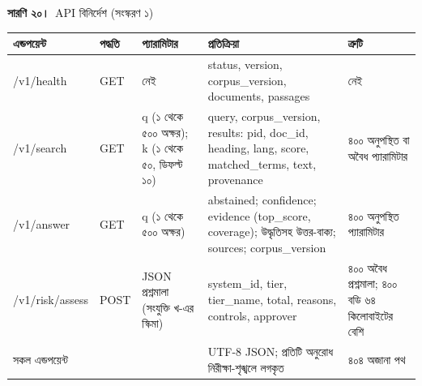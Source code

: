 \documentclass[border=10pt]{standalone}
\begin{document}
\begin{minipage}{17cm}
{\large\bfseries সারণি ২০।}\ {\large API বিনির্দেশ (সংস্করণ ১)}\par\vspace{7pt}
\small
{}
\begin{tabularx}{\linewidth}{@{}>{\hsize=1.105\hsize\raggedright\arraybackslash}X>{\hsize=0.407\hsize\raggedright\arraybackslash}X>{\hsize=1.163\hsize\raggedright\arraybackslash}X>{\hsize=1.512\hsize\raggedright\arraybackslash}X>{\hsize=0.814\hsize\raggedright\arraybackslash}X@{}}
\arrayrulecolor{bapilrule}\toprule
\rowcolor{white}\textbf{এন্ডপয়েন্ট} & \textbf{পদ্ধতি} & \textbf{প্যারামিটার} & \textbf{প্রতিক্রিয়া} & \textbf{ত্রুটি} \\
\midrule
/\allowbreak{}v1/\allowbreak{}health & GET & নেই & status, version, corpus\_version, documents, passages & নেই \\
/\allowbreak{}v1/\allowbreak{}search & GET & q (১ থেকে ৫০০ অক্ষর); k (১ থেকে ৫০, ডিফল্ট ১০) & query, corpus\_version, results: pid, doc\_id, heading, lang, score, matched\_terms, text, provenance & ৪০০ অনুপস্থিত বা অবৈধ প্যারামিটার \\
/\allowbreak{}v1/\allowbreak{}answer & GET & q (১ থেকে ৫০০ অক্ষর) & abstained; confidence; evidence (top\_score, coverage); উদ্ধৃতিসহ উত্তর-বাক্য; sources; corpus\_version & ৪০০ অনুপস্থিত প্যারামিটার \\
/\allowbreak{}v1/\allowbreak{}risk/\allowbreak{}assess & POST & JSON প্রশ্নমালা (সংযুক্তি খ-এর স্কিমা) & system\_id, tier, tier\_name, total, reasons, controls, approver & ৪০০ অবৈধ প্রশ্নমালা; ৪০০ বডি ৬৪ কিলোবাইটের বেশি \\
সকল এন্ডপয়েন্ট &  &  & UTF-8 JSON; প্রতিটি অনুরোধ নিরীক্ষা-শৃঙ্খলে লগকৃত & ৪০৪ অজানা পথ \\
\bottomrule
\end{tabularx}
\par{}
\end{minipage}
\end{document}
